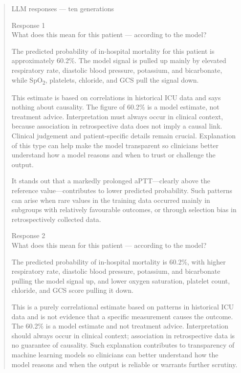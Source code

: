 \documentclass[12pt, a4paper]{article}
\begin{document}
\begin{quote}\footnotesize
LLM responses --- ten generations

Response 1\\
What does this mean for this patient --- according to the model?

The predicted probability of in-hospital mortality for this patient is approximately 60.2\%. The model signal is pulled up mainly by elevated respiratory rate, diastolic blood pressure, potassium, and bicarbonate, while SpO\textsubscript{2}, platelets, chloride, and GCS pull the signal down.

This estimate is based on correlations in historical ICU data and says nothing about causality. The figure of 60.2\% is a model estimate, not treatment advice. Interpretation must always occur in clinical context, because association in retrospective data does not imply a causal link. Clinical judgement and patient-specific details remain crucial. Explanation of this type can help make the model transparent so clinicians better understand how a model reasons and when to trust or challenge the output.

It stands out that a markedly prolonged aPTT---clearly above the reference value---contributes to lower predicted probability. Such patterns can arise when rare values in the training data occurred mainly in subgroups with relatively favourable outcomes, or through selection bias in retrospectively collected data.

Response 2\\
What does this mean for this patient --- according to the model?

The predicted probability of in-hospital mortality is 60.2\%, with higher respiratory rate, diastolic blood pressure, potassium, and bicarbonate pulling the model signal up, and lower oxygen saturation, platelet count, chloride, and GCS score pulling it down.

This is a purely correlational estimate based on patterns in historical ICU data and is not evidence that a specific measurement causes the outcome. The 60.2\% is a model estimate and not treatment advice. Interpretation should always occur in clinical context; association in retrospective data is no guarantee of causality. Such explanation contributes to transparency of machine learning models so clinicians can better understand how the model reasons and when the output is reliable or warrants further scrutiny.


\end{quote}
\end{document}
